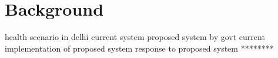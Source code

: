 \section{Background}
\textcolor{red}{}
\begin{comment}
Build up the context that the reader could read, like a story, to understand more about the problem you’re addressing, the phenomena you are talking about. If the paper is about an internet ban in Bangladesh, tell the story about how the ban was put in place, what was the timeline like, who said what in popular press, and so on. If the research was conducted in the context of an organization of health/outreach workers, talk about the organization, its charter, what it has done/is doing.
\end{comment}
\begin{comment}
With its massive population of over a billion people, India is faced with the logistical challenge of dispensing quality health care to each and every citizen irrespective of geographical location and economic status. Today, even in the capital city of Delhi, there is a vast difference in the level of access and quality of health care received by people from different socio-economic groups.

The Delhi government has proposed an interesting way to tackle this. It is planning to set up a 3-tier system where the lowest tier is a system of ‘Mohalla Clinics’, government clinics in each neighborhood which provide free consultation, tests and medicines. While the existing dispensaries are meant to cater to 50,000 people, each clinic will cater to around 10,000 people in a locality. So far around a hundred clinics have been set up and the government aims to open 1000 such clinics by the end of the year.

According to one doctor I met, the clinics have been set up haphazardly by the government as an immediate response to the crisis. Mohalla clinics are being set up in rented rooms or with pre-made structures around the city. Those running them are doctors coming out of retirement or wanting to give back to society. The government pays the doctors around Rs 30 for every patient they see which is lower than what they would have received at a private practice. The clinics in operation have little in common save the promise to provide quality health care, the facilities available and the staff employed vary.

The two clinics in my area were open only from 9am to 1pm, 6 days a week, during the time many people work. One clinic I visited had a waiting time of around 2 hours while the other had practically no waiting time, though both saw the same number of visitors in a day. At the moment, the clinics are relying on word of mouth to bring new customers. 
*****
\end{comment}
health scenario in delhi
\cite{mazumdar2015health}
current system 
proposed system by govt
current implementation of proposed system
response to proposed system
********

